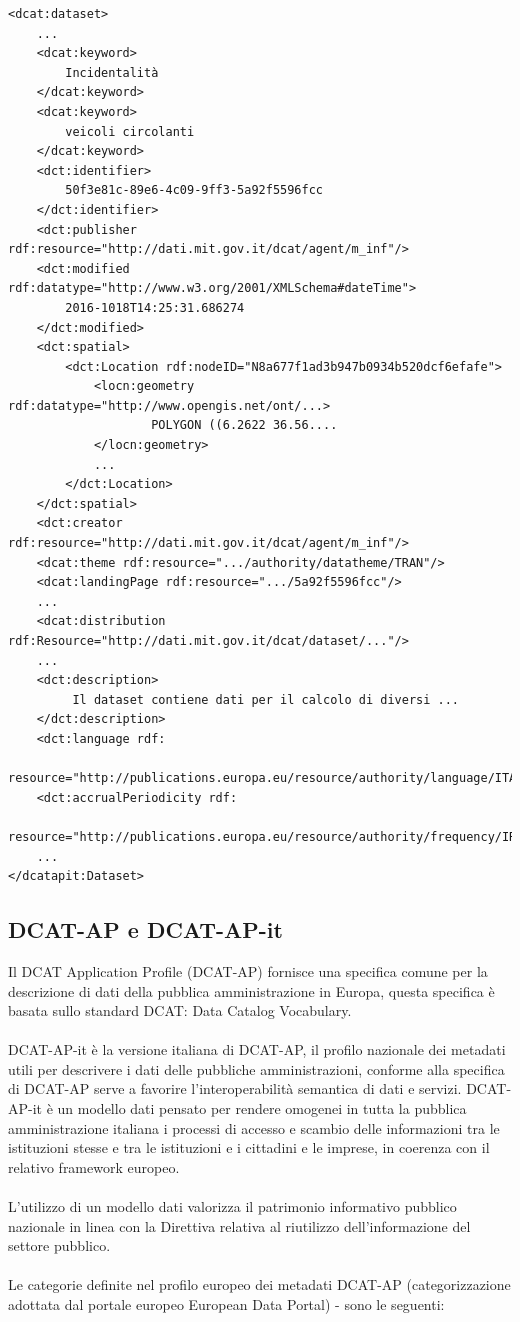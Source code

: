 \documentclass{article}
\theoremstyle{plain}
\theoremstyle{definition}
\begin{document}
\newpage
\begin{verbatim}
<dcat:dataset>
    ...
    <dcat:keyword>
        Incidentalità
	</dcat:keyword>
    <dcat:keyword>
        veicoli circolanti
    </dcat:keyword>
    <dct:identifier>
        50f3e81c-89e6-4c09-9ff3-5a92f5596fcc
    </dct:identifier>
    <dct:publisher rdf:resource="http://dati.mit.gov.it/dcat/agent/m_inf"/>
    <dct:modified rdf:datatype="http://www.w3.org/2001/XMLSchema#dateTime">
        2016-1018T14:25:31.686274
    </dct:modified>
    <dct:spatial>
        <dct:Location rdf:nodeID="N8a677f1ad3b947b0934b520dcf6efafe">
            <locn:geometry rdf:datatype="http://www.opengis.net/ont/...>
                    POLYGON ((6.2622 36.56....
            </locn:geometry>
            ...
        </dct:Location>
    </dct:spatial>
    <dct:creator rdf:resource="http://dati.mit.gov.it/dcat/agent/m_inf"/>
    <dcat:theme rdf:resource=".../authority/datatheme/TRAN"/>
    <dcat:landingPage rdf:resource=".../5a92f5596fcc"/>
    ...
    <dcat:distribution rdf:Resource="http://dati.mit.gov.it/dcat/dataset/..."/>
    ...	
    <dct:description>
         Il dataset contiene dati per il calcolo di diversi ...
    </dct:description>
    <dct:language rdf:
        resource="http://publications.europa.eu/resource/authority/language/ITA"/>
    <dct:accrualPeriodicity rdf:
        resource="http://publications.europa.eu/resource/authority/frequency/IRREG"/>
    ...
</dcatapit:Dataset>
\end{verbatim}

\newpage
\subsection{DCAT-AP e DCAT-AP-it}
Il DCAT Application Profile (DCAT-AP) fornisce una specifica comune per la descrizione di dati della pubblica amministrazione in Europa, questa specifica è basata sullo standard DCAT: Data Catalog Vocabulary. \footnotemark
{}
\\
\\
DCAT-AP-it è la versione italiana di DCAT-AP, il profilo nazionale dei metadati utili per descrivere i dati delle pubbliche amministrazioni, conforme alla specifica di DCAT-AP serve a favorire l'interoperabilità semantica di dati e servizi. DCAT-AP-it è un modello dati pensato per rendere omogenei in tutta la pubblica amministrazione italiana i processi di accesso e scambio delle informazioni tra le istituzioni stesse e tra le istituzioni e i cittadini e le imprese, in coerenza con il relativo framework europeo. 
\\
\\
L'utilizzo di un modello dati valorizza il patrimonio informativo pubblico nazionale in linea con la Direttiva relativa al riutilizzo dell'informazione del settore pubblico.
\\
\\
Le categorie definite nel profilo europeo dei metadati DCAT-AP (categorizzazione adottata dal portale europeo European Data Portal) - sono le seguenti:
\end{document}
